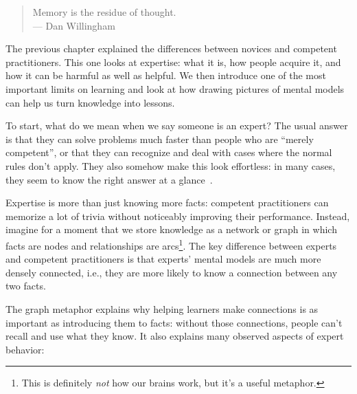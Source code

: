 
\begin{quote}

  Memory is the residue of thought. \\
  --- Dan Willingham

\end{quote}

The previous chapter explained the differences between novices and competent practitioners.
This one looks at expertise:
what it is,
how people acquire it,
and how it can be harmful as well as helpful.
We then introduce one of the most important limits on learning
and look at how drawing pictures of mental models can help us turn knowledge into lessons.

To start,
what do we mean when we say someone is an expert?
The usual answer is that they can solve problems much faster than people who are ``merely competent'',
or that they can recognize and deal with cases where the normal rules don't apply.
They also somehow make this look effortless:
in many cases,
they seem to know the right answer at a glance~\cite{Parn2017}.

Expertise is more than just knowing more facts:
competent practitioners can memorize a lot of trivia without noticeably improving their performance.
Instead,
imagine for a moment that we store knowledge as a network or graph
in which facts are nodes
and relationships are arcs\footnote{This is definitely \emph{not} how our brains work, but it's a useful metaphor.}.
The key difference between experts and competent practitioners is that
experts' mental models are much more densely connected,
i.e.,
they are more likely to know a connection between any two facts.

The graph metaphor explains why helping learners make connections
is as important as introducing them to facts:
without those connections,
people can't recall and use what they know.
It also explains many observed aspects of expert behavior:

